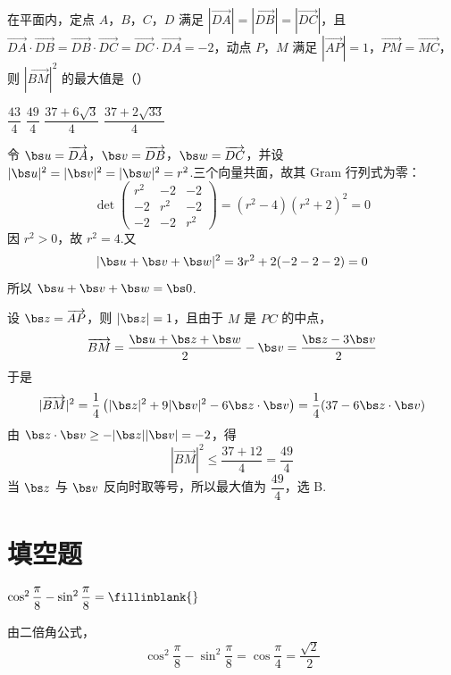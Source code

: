 \begin{problem}
在平面内，定点 \(A\)，\(B\)，\(C\)，\(D\) 满足 \(\left|\overrightarrow{DA}\right|=\left|\overrightarrow{DB}\right|=\left|\overrightarrow{DC}\right|\)，且 \(\overrightarrow{DA}\cdot\overrightarrow{DB}=\overrightarrow{DB}\cdot\overrightarrow{DC}=\overrightarrow{DC}\cdot\overrightarrow{DA}=-2\)，动点 \(P\)，\(M\) 满足 \(\left|\overrightarrow{AP}\right|=1\)，\(\overrightarrow{PM}=\overrightarrow{MC}\)，则 \(\left|\overrightarrow{BM}\right|^2\) 的最大值是（\quad）

\choices
    {\(\dfrac{43}{4}\)}
    {\(\dfrac{49}{4}\)}
    {\(\dfrac{37+6\sqrt3}{4}\)}
    {\(\dfrac{37+2\sqrt{33}}{4}\)}

\begin{solution}
令 \(\bs u=\overrightarrow{DA}\)，\(\bs v=\overrightarrow{DB}\)，\(\bs w=\overrightarrow{DC}\)，并设 \(|\bs u|^2=|\bs v|^2=|\bs w|^2=r^2\).三个向量共面，故其 Gram 行列式为零：
\[
\det\begin{pmatrix}r^2&-2&-2\\-2&r^2&-2\\-2&-2&r^2\end{pmatrix}=(r^2-4)(r^2+2)^2=0
\]
因 \(r^2>0\)，故 \(r^2=4\).又
\[
|\bs u+\bs v+\bs w|^2=3r^2+2(-2-2-2)=0
\]
所以 \(\bs u+\bs v+\bs w=\bs0\).

设 \(\bs z=\overrightarrow{AP}\)，则 \(|\bs z|=1\)，且由于 \(M\) 是 \(PC\) 的中点，
\[
\overrightarrow{BM}=\frac{\bs u+\bs z+\bs w}{2}-\bs v=\frac{\bs z-3\bs v}{2}
\]
于是
\[
|\overrightarrow{BM}|^2=\frac14\left(|\bs z|^2+9|\bs v|^2-6\bs z\cdot\bs v\right)=\frac14(37-6\bs z\cdot\bs v)
\]
由 \(\bs z\cdot\bs v\geq-|\bs z||\bs v|=-2\)，得
\[
|\overrightarrow{BM}|^2\leq\frac{37+12}{4}=\frac{49}{4}
\]
当 \(\bs z\) 与 \(\bs v\) 反向时取等号，所以最大值为 \(\dfrac{49}{4}\)，选 B.
\end{solution}
\end{problem}


\section{填空题}

\begin{problem}
\(\cos^2\dfrac{\pi}{8}-\sin^2\dfrac{\pi}{8}=\fillinblank{}\)

\begin{solution}
由二倍角公式，
\[
\cos^2\frac{\pi}{8}-\sin^2\frac{\pi}{8}=\cos\frac{\pi}{4}=\frac{\sqrt2}{2}
\]
\end{solution}
\end{problem}



